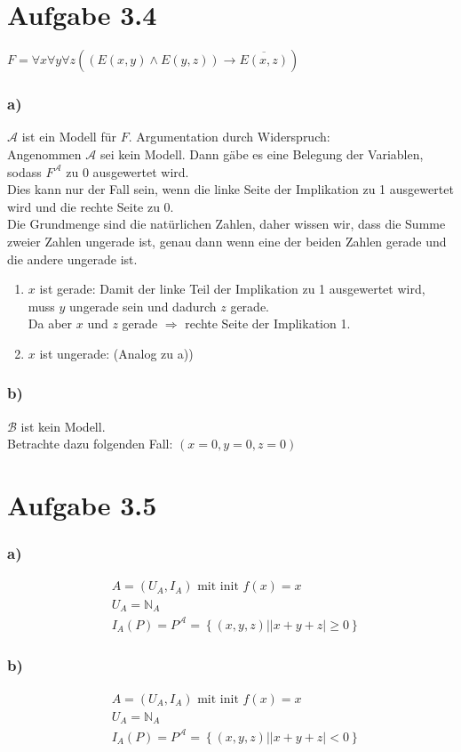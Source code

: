 \documentclass[a4paper,12pt]{article}
\begin{document}
	
	\section*{Aufgabe 3.4}
	\begin{center}
		$F = \forall x \forall y \forall z \left(\left(E\left(x,y\right) \wedge E\left(y,z\right)\right) \rightarrow \overline{E\left(x,z\right)}\right)$
	\end{center}
	\subsubsection*{a)}
	$\mathcal{A}$ ist ein Modell für $F$. Argumentation durch Widerspruch:\\
	
	Angenommen $\mathcal{A}$ sei kein Modell. Dann gäbe es eine Belegung der Variablen, sodass $F^{\mathcal{A}}$ zu 0 ausgewertet wird.\\
	Dies kann nur der Fall sein, wenn die linke Seite der Implikation zu 1 ausgewertet wird und die rechte Seite zu 0.\\
	Die Grundmenge sind die natürlichen Zahlen, daher wissen wir, dass die Summe zweier Zahlen ungerade ist, genau dann wenn eine der beiden Zahlen gerade und die andere ungerade ist.
	\begin{enumerate}[1.]
		\item $x$ ist gerade: Damit der linke Teil der Implikation zu 1 ausgewertet wird, muss $y$ ungerade sein und dadurch $z$ gerade.\\
		Da aber $x$ und $z$ gerade $\Rightarrow$ rechte Seite der Implikation 1.
		\item $x$ ist ungerade: (Analog zu a)) 
	\end{enumerate}

	\subsubsection*{b)}
	$\mathcal{B}$ ist kein Modell.\\
	
	Betrachte dazu folgenden Fall: $\left(x=0, y=0, z=0\right)$
	
	\section*{Aufgabe 3.5}
	\subsubsection*{a)}
	\begin{align*}
		&A = \left(U_A, I_A\right)\text{ mit init }f\left(x\right) = x\\
		&U_A = \mathbb{N}_A\\
		&I_A \left(P\right) = P^\mathcal{A} = \left\lbrace \left(x,y,z\right) | \left|x+y+z\right|\geq 0\right\rbrace
	\end{align*}
	\subsubsection*{b)}
	\begin{align*}
	&A = \left(U_A, I_A\right)\text{ mit init }f\left(x\right) = x\\
	&U_A = \mathbb{N}_A\\
	&I_A \left(P\right) = P^\mathcal{A} = \left\lbrace \left(x,y,z\right) | \left|x+y+z\right|< 0\right\rbrace
	\end{align*}
\end{document}
